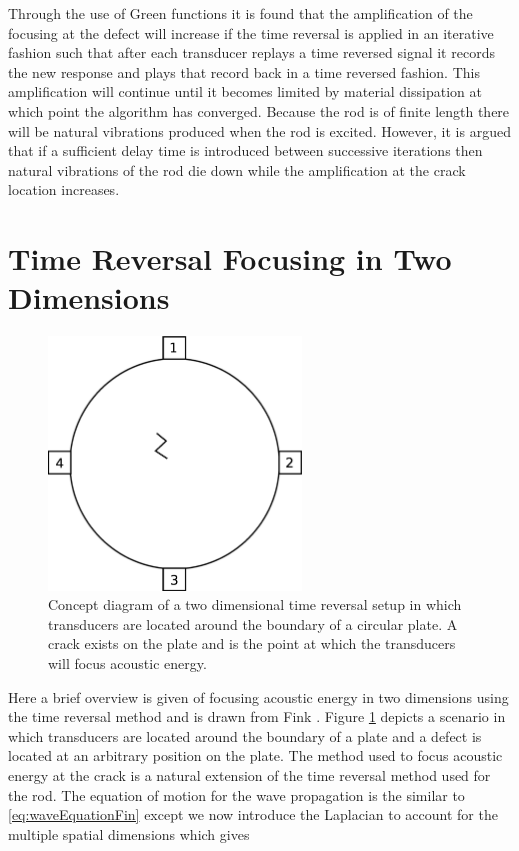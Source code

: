 
Through the use of Green functions it is found that the amplification of the focusing at the defect will increase if the time reversal is applied in an iterative fashion such that after each transducer replays a time reversed signal it records the new response and plays that record back in a time reversed fashion. This amplification will continue until it becomes limited by material dissipation at which point the algorithm has converged. Because the rod is of finite length there will be natural vibrations produced when the rod is excited. However, it is argued that if a sufficient delay time is introduced between successive iterations then natural vibrations of the rod die down while the amplification at the crack location increases.

\section{Time Reversal Focusing in Two Dimensions}

\begin{figure}[ht!]
\centering
\includegraphics[width=0.6\textwidth]{eps_pics/2dTr.eps}
\caption{Concept diagram of a two dimensional time reversal setup in which transducers are located around the boundary of a circular plate. A crack exists on the plate and is the point at which the transducers will focus acoustic energy.
	 \label{fig:2dTr}} 
\end{figure}

Here a brief overview is given of focusing acoustic energy in two dimensions using the time reversal method and is drawn from Fink \cite{Fink1992}. Figure \ref{fig:2dTr} depicts a scenario in which transducers are located around the boundary of a plate and a defect is located at an arbitrary position on the plate. The method used to focus acoustic energy at the crack is a natural extension of the time reversal method used for the rod. The equation of motion for the wave propagation is the similar to \ref{eq:waveEquationFin} except we now introduce the Laplacian to account for the multiple spatial dimensions which gives

